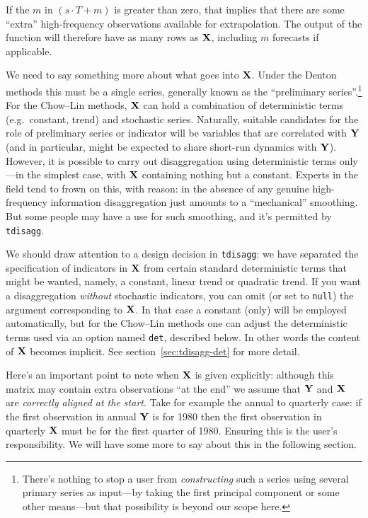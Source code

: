 If the $m$ in $(s \cdot T + m)$ is greater than zero, that implies
that there are some ``extra'' high-frequency observations available
for extrapolation. The output of the function will therefore have as
many rows as $\mathbf{X}$, including $m$ forecasts if applicable.

We need to say something more about what goes into $\mathbf{X}$. Under the
Denton methods this must be a single series, generally known as the
``preliminary series''.\footnote{There's nothing to stop a user from
  \textit{constructing} such a series using several primary series as
  input---by taking the first principal component or some other
  means---but that possibility is beyond our scope here.} For the
Chow--Lin methods, $\mathbf{X}$ can hold a combination of deterministic terms
(e.g.\ constant, trend) and stochastic series. Naturally, suitable
candidates for the role of preliminary series or indicator will be
variables that are correlated with $\mathbf{Y}$ (and in particular, might be
expected to share short-run dynamics with $\mathbf{Y}$). However, it is
possible to carry out disaggregation using deterministic terms
only---in the simplest case, with $\mathbf{X}$ containing nothing but a
constant. Experts in the field tend to frown on this, with reason: in
the absence of any genuine high-frequency information disaggregation
just amounts to a ``mechanical'' smoothing. But some people may have a
use for such smoothing, and it's permitted by \texttt{tdisagg}.

We should draw attention to a design decision in \texttt{tdisagg}: we
have separated the specification of indicators in $\mathbf{X}$ from certain
standard deterministic terms that might be wanted, namely, a constant,
linear trend or quadratic trend. If you want a disaggregation
\textit{without} stochastic indicators, you can omit (or set to
\texttt{null}) the argument corresponding to $\mathbf{X}$. In that case a
constant (only) will be employed automatically, but for the Chow--Lin
methods one can adjust the deterministic terms used via an option
named \texttt{det}, described below. In other words the content of
$\mathbf{X}$ becomes implicit. See section~\ref{sec:tdisagg-det} for more
detail.

Here's an important point to note when $\mathbf{X}$ is given explicitly:
although this matrix may contain extra observations ``at the end'' we
assume that $\mathbf{Y}$ and $\mathbf{X}$ are \textit{correctly aligned at the
  start}. Take for example the annual to quarterly case: if the first
observation in annual $\mathbf{Y}$ is for 1980 then the first observation in
quarterly $\mathbf{X}$ must be for the first quarter of 1980. Ensuring this
is the user's responsibility. We will have some more to say about this
in the following section.

